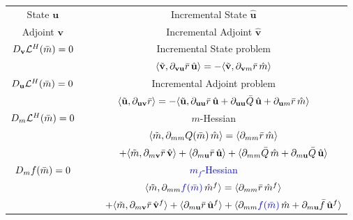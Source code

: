 \documentclass[10pt,xcolor=dvipsnames,compress]{beamer}
\begin{document}
\begin{frame}
\begin{table}[]
    \centering
    \begin{tabular}{c|c}
    \hline
      State $\mathbf{u}$&  Incremental State $\hat{\mathbf{u}}$   
      \\
      Adjoint $\mathbf{v}$  &  Incremental Adjoint $\hat{\mathbf{v}}$   
      \\\hline
      {$D_\mathbf{v}\mathcal{L}^H(\Bar{m}) = 0  $ }
      &
      Incremental State problem 
       \\
      & 
      $\langle  \Tilde{\mathbf{v}}, \partial_{\mathbf{vu}}\Bar{r}\,\hat{\mathbf{u}}  \rangle 
    = - 
    \langle  \Tilde{\mathbf{v}}, \partial_{\mathbf{v}m}\Bar{r}\,\hat{m}  \rangle$  
      \\\hline
      {$D_\mathbf{u}\mathcal{L}^H(\Bar{m}) = 0  $  }
      &
      Incremental Adjoint problem
      \\
      & 
       $\langle  \Tilde{\mathbf{u}}, \partial_{\mathbf{uv}}\Bar{r}  \rangle 
    = - 
    \langle  
    \Tilde{\mathbf{u}}, \partial_{\mathbf{uu}}\Bar{r}\,\hat{\mathbf{u}}
    +
    \partial_{\mathbf{uu}} \Bar{Q}\,\hat{\mathbf{u}}
    +
    \partial_{\mathbf{u}m}\Bar{r}\,\hat{m}
    \rangle$
      \\\hline
      {$D_m\mathcal{L}^H(\Bar{m}) = 0  $}
    &
    $m$-Hessian
    \\
         &
    $\langle\Tilde{m}, \partial_{mm}Q(\Bar{m})\,\hat{m}\rangle 
       = 
      \langle \partial_{mm}\Bar{r}\,\hat{m}\rangle$
      \\
      &
      $\qquad+
      \langle  \Tilde{m}, \partial_{m\mathbf{v}}\Bar{r}\,\hat{\mathbf{v}}  \rangle +
      \langle \partial_{m\mathbf{u}}\Bar{r}\,\hat{\mathbf{u}} \rangle + \langle \partial_{mm}\Bar{Q}\,\hat{m} + \partial_{m\mathbf{u}}\Bar{Q}\,\hat{\mathbf{u}} \rangle$
      \\\hline
      \textcolor{blue}{{$D_m f(\Bar{m}) = 0  $}}
    &
    \textcolor{blue}{$m_f$-Hessian}
    \\
         &
    $\langle\Tilde{m}, \partial_{mm}\textcolor{blue}{f(\Bar{m})}\,\hat{m}^{f}\rangle 
       = 
      \langle \partial_{mm}\Bar{r}\,\hat{m}^{f}\rangle$
      \\
      &
      $\qquad+
      \langle  \Tilde{m}, \partial_{m\mathbf{v}}\Bar{r}\,\hat{\mathbf{v}}^{f}  \rangle +
      \langle \partial_{m\mathbf{u}}\Bar{r}\,\hat{\mathbf{u}}^{f} \rangle + \langle \partial_{mm}\textcolor{blue}{{f}(\Bar{m})}\,\hat{m} + \partial_{m\mathbf{u}}\Bar{f}\,\hat{\mathbf{u}}^{f} \rangle$
    

      \\\hline
    \end{tabular}
\end{table}




\vfill
\end{frame}
\end{document}
